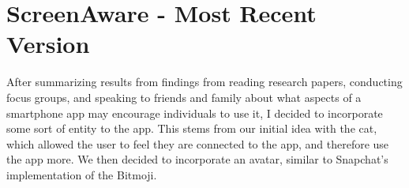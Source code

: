 \documentclass[12pt, title page, manuscript, nonacm]{acmart}
\begin{document}

\section*{ScreenAware - Most Recent Version}
After summarizing results from findings from reading research papers, conducting focus groups, and speaking to friends and family about what aspects of a smartphone app may encourage individuals to use it, I decided to incorporate some sort of entity to the app. This stems from our initial idea with the cat, which allowed the user to feel they are connected to the app, and therefore use the app more. We then decided to incorporate an avatar\cite{wood2020me}, similar to Snapchat's implementation of the Bitmoji. 
\end{document}
